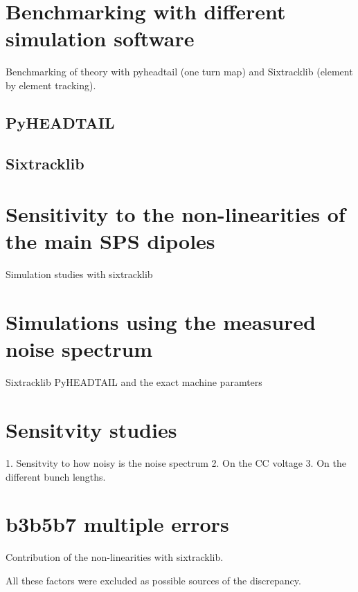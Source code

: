 \section{Benchmarking with different simulation software}
Benchmarking of theory with pyheadtail (one turn map) and Sixtracklib (element by element tracking).

\subsection{PyHEADTAIL}
\subsection{Sixtracklib}

\section{Sensitivity to the non-linearities of the main SPS dipoles}
Simulation studies with sixtracklib

\section{Simulations using the measured noise spectrum}
Sixtracklib PyHEADTAIL and the exact machine paramters

\section{Sensitvity studies}
1. Sensitvity to how noisy is the noise spectrum
2. On the CC voltage
3. On the different bunch lengths. 

\section{b3b5b7 multiple errors}
Contribution of the non-linearities with sixtracklib.


All these factors were excluded as possible sources of the discrepancy.